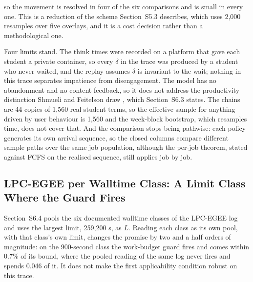 \documentclass[mathematics,supfile,submit,moreauthors]{Definitions/mdpi}
\newcommand{\devnum}[1]{#1}
\begin{document}
\noindent so the movement is resolved in four of the six comparisons and is small in
every one. This is a reduction of the scheme Section~S5.3 describes, which uses
\devnum{2{,}000} resamples over five overlays, and it is a cost decision rather than a
methodological one.

Four limits stand. The think times were recorded on a platform that gave each student a
private container, so every $\delta$ in the trace was produced by a student who never
waited, and the replay assumes $\delta$ is invariant to the wait; nothing in this trace
separates impatience from disengagement. The model has no abandonment and no content
feedback, so it does not address the productivity distinction Shmueli and Feitelson draw
\cite{shmueli2009simulation}, which Section~S6.3 states. The chains are \devnum{44}
copies of \devnum{1{,}560} real student-terms, so the effective sample for anything
driven by user behaviour is \devnum{1{,}560} and the week-block bootstrap, which
resamples time, does not cover that. And the comparison stops being pathwise: each
policy generates its own arrival sequence, so the closed columns compare different sample
paths over the same job population, although the per-job theorem, stated against FCFS on
the realised sequence, still applies job by job.

\subsection{LPC-EGEE per Walltime Class: A Limit Class Where the Guard Fires}
\label{sec:supp_lpc_queues}

Section~S6.4 pools the six documented walltime classes of the LPC-EGEE log and uses the
largest limit, \devnum{259{,}200} s, as $L$. Reading each class as its own pool, with
that class's own limit, changes the promise by two and a half orders of magnitude: on the
\devnum{900}-second class the work-budget guard fires and comes within \devnum{0.7\%} of
its bound, where the pooled reading of the same log never fires and spends
\devnum{0.046} of it. It does not make the first applicability condition robust on this
trace.
\end{document}
